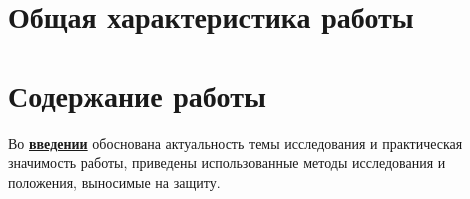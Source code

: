 \section*{Общая характеристика работы}

\newcommand{\actuality}{\pdfbookmark[1]{Актуальность}{actuality}\underline{\textbf{\actualityTXT}}}
\newcommand{\progress}{\pdfbookmark[1]{Разработанность темы}{progress}\underline{\textbf{\progressTXT}}}
\newcommand{\aim}{\pdfbookmark[1]{Цели}{aim}\underline{{\textbf\aimTXT}}}
\newcommand{\tasks}{\pdfbookmark[1]{Задачи}{tasks}\underline{\textbf{\tasksTXT}}}
\newcommand{\aimtasks}{\pdfbookmark[1]{Цели и задачи}{aimtasks}\aimtasksTXT}
\newcommand{\novelty}{\pdfbookmark[1]{Научная новизна}{novelty}\underline{\textbf{\noveltyTXT}}}
\newcommand{\influence}{\pdfbookmark[1]{Практическая значимость}{influence}\underline{\textbf{\influenceTXT}}}
\newcommand{\methods}{\pdfbookmark[1]{Методология и методы исследования}{methods}\underline{\textbf{\methodsTXT}}}
\newcommand{\defpositions}{\pdfbookmark[1]{Положения, выносимые на защиту}{defpositions}\underline{\textbf{\defpositionsTXT}}}
\newcommand{\reliability}{\pdfbookmark[1]{Достоверность}{reliability}\underline{\textbf{\reliabilityTXT}}}
\newcommand{\probation}{\pdfbookmark[1]{Апробация}{probation}\underline{\textbf{\probationTXT}}}
\newcommand{\contribution}{\pdfbookmark[1]{Личный вклад}{contribution}\underline{\textbf{\contributionTXT}}}
\newcommand{\publications}{\pdfbookmark[1]{Публикации}{publications}\underline{\textbf{\publicationsTXT}}}





\section*{Содержание работы}
Во \underline{\textbf{введении}} обоснована актуальность темы исследования и практическая значимость работы, приведены использованные методы исследования и положения, выносимые на защиту.

